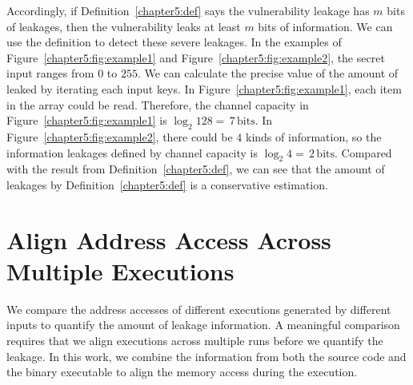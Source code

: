 Accordingly, if Definition~\ref{chapter5:def} says the vulnerability leakage has $m$ bits of leakages, then the vulnerability leaks at least $m$ bits of information. We can use the definition to detect these severe leakages. In the examples of Figure~\ref{chapter5:fig:example1} and Figure~\ref{chapter5:fig:example2}, the secret input ranges from $0$ to $255$. We can calculate the precise value of the amount of leaked by iterating each input keys. In Figure~\ref{chapter5:fig:example1}, each item in the array could be read. Therefore, the channel capacity in Figure~\ref{chapter5:fig:example1} is $\log_2{128} = \,7\, \mathrm{bits}$. In Figure~\ref{chapter5:fig:example2}, there could be $4$ kinds of information, so the information leakages defined by channel capacity is $\log_2{4} = \,2\, \mathrm{bits}$. Compared with the result from Definition~\ref{chapter5:def}, we can see that the amount of leakages by Definition~\ref{chapter5:def} is a conservative estimation.

\section{Align Address Access Across Multiple Executions}
We compare the address accesses of different executions generated by different inputs to quantify the amount of leakage information. A meaningful comparison requires that we align executions across multiple runs before we quantify the leakage. In this work, we combine the information from both the source code and the binary executable to align the memory access during the execution.


